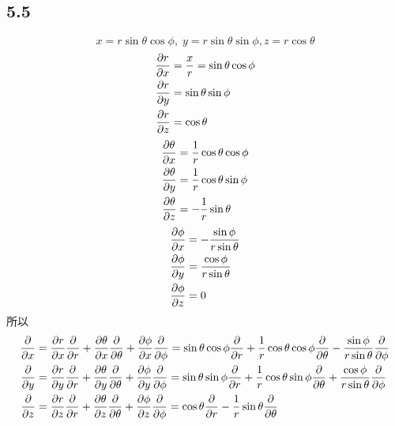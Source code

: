 \subsection{5.5}
\begin{equation}\label{key}
x = r\sin\theta\cos\phi ,\; y = r\sin\theta\sin\phi, z = r\cos\theta
\end{equation}
\begin{align}
\pdv{r}{x} &= \dfrac{x}{r} = \sin\theta\cos\phi \\
\pdv{r}{y} &= \sin\theta\sin\phi \\
\pdv{r}{z} &= \cos\theta
\end{align}
\begin{align}
\pdv{\theta}{x} &= \dfrac{1}{r}\cos\theta\cos\phi \\
\pdv{\theta}{y} &= \dfrac{1}{r}\cos\theta\sin\phi \\
\pdv{\theta}{z} &= -\dfrac{1}{r}\sin\theta
\end{align}
\begin{align}
\pdv{\phi}{x} &= -\dfrac{\sin\phi}{r\sin\theta} \\
\pdv{\phi}{y} &= \dfrac{\cos\phi}{r\sin\theta} \\
\pdv{\phi}{z} &= 0
\end{align}
所以
\begin{align}
\pdv{x} &= \pdv{r}{x} \pdv{r} + \pdv{\theta}{x} \pdv{\theta} + \pdv{\phi}{x} \pdv{\phi} = \sin\theta\cos\phi \pdv{r} + \dfrac{1}{r}\cos\theta\cos\phi \pdv{\theta} -\dfrac{\sin\phi}{r\sin\theta} \pdv{\phi} \\
\pdv{y} &= \pdv{r}{y} \pdv{r} + \pdv{\theta}{y} \pdv{\theta} + \pdv{\phi}{y} \pdv{\phi} = \sin\theta\sin\phi \pdv{r} + \dfrac{1}{r}\cos\theta\sin\phi \pdv{\theta} +\dfrac{\cos\phi}{r\sin\theta} \pdv{\phi} \\
\pdv{z} &= \pdv{r}{z} \pdv{r} + \pdv{\theta}{z} \pdv{\theta} + \pdv{\phi}{z} \pdv{\phi} = \cos\theta \pdv{r} - \dfrac{1}{r}\sin\theta \pdv{\theta}
\end{align}
